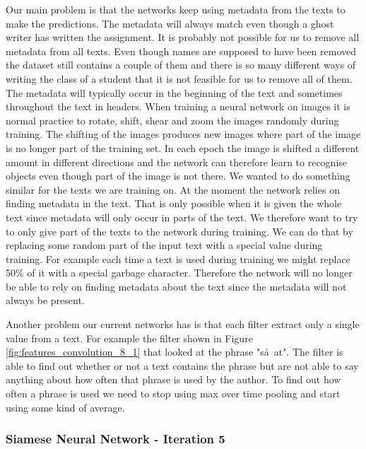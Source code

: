 Our main problem is that the networks keep using metadata from the texts to
make the predictions. The metadata will always match even though a ghost writer
has written the assignment. It is probably not possible for us to remove all
metadata from all texts. Even though names are supposed to have been removed
the dataset still contains a couple of them and there is so many different ways
of writing the class of a student that it is not feasible for us to remove
all of them. The metadata will typically occur in the beginning of the text
and sometimes throughout the text in headers. When training a neural network
on images it is normal practice to rotate, shift, shear and zoom the images
randomly during training. The shifting of the images produces new images where
part of the image is no longer part of the training set. In each epoch the
image is shifted a different amount in different directions and the network can
therefore learn to recognise objects even though part of the image is not there.
We wanted to do something similar for the texts we are training on. At the
moment the network relies on finding metadata in the text. That is only possible
when it is given the whole text since metadata will only occur in parts of the
text. We therefore want to try to only give part of the texts to the network
during training. We can do that by replacing some random part of the input text
with a special value during training. For example each time a text is used
during training we might replace 50\% of it with a special garbage character.
Therefore the network will no longer be able to rely on finding metadata about
the text since the metadata will not always be present.

Another problem our current networks has is that each filter extract
only a single value from a text. For example the filter shown in Figure
\ref{fig:features_convolution_8_1} that looked at the phrase "s\aa\ at". The
filter is able to find out whether or not a text contains the phrase but are not
able to say anything about how often that phrase is used by the author. To find
out how often a phrase is used we need to stop using max over time pooling and
start using some kind of average.


\subsubsection{Siamese Neural Network - Iteration 5}

